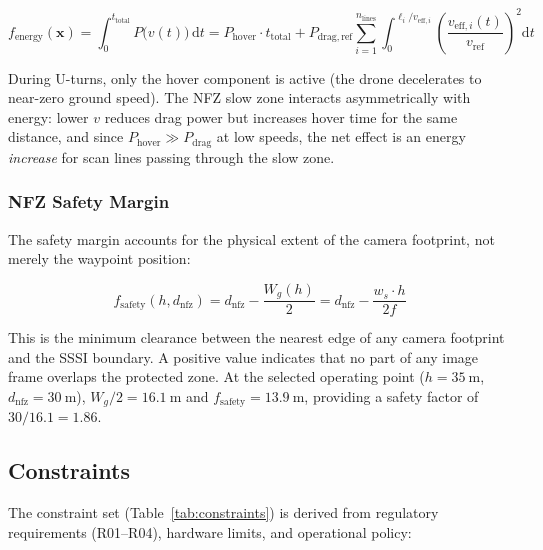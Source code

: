 \begin{equation}\label{eq:energy}
  f_{\mathrm{energy}}(\mathbf{x}) = \int_0^{t_{\mathrm{total}}} P\bigl(v(t)\bigr) \, \mathrm{d}t = P_{\mathrm{hover}} \cdot t_{\mathrm{total}} + P_{\mathrm{drag,ref}} \sum_{i=1}^{n_{\mathrm{lines}}} \int_0^{\ell_i / v_{\mathrm{eff},i}} \!\left(\frac{v_{\mathrm{eff},i}(t)}{v_{\mathrm{ref}}}\right)^{\!2} \mathrm{d}t
\end{equation}

\noindent During U-turns, only the hover component is active (the drone decelerates to near-zero ground speed). The NFZ slow zone interacts asymmetrically with energy: lower $v$ reduces drag power but increases hover time for the same distance, and since $P_{\mathrm{hover}} \gg P_{\mathrm{drag}}$ at low speeds, the net effect is an energy \emph{increase} for scan lines passing through the slow zone.

\subsubsection{NFZ Safety Margin}\label{sec:obj-safety}

The safety margin accounts for the physical extent of the camera footprint, not merely the waypoint position:

\begin{equation}\label{eq:safety}
  f_{\mathrm{safety}}(h, d_{\mathrm{nfz}}) = d_{\mathrm{nfz}} - \frac{W_g(h)}{2} = d_{\mathrm{nfz}} - \frac{w_s \cdot h}{2f}
\end{equation}

\noindent This is the minimum clearance between the nearest edge of any camera footprint and the SSSI boundary. A positive value indicates that no part of any image frame overlaps the protected zone. At the selected operating point ($h = \SI{35}{\metre}$, $d_{\mathrm{nfz}} = \SI{30}{\metre}$), $W_g/2 = \SI{16.1}{\metre}$ and $f_{\mathrm{safety}} = \SI{13.9}{\metre}$, providing a safety factor of $30/16.1 = 1.86$.

\subsection{Constraints}\label{sec:constraints}

The constraint set (Table~\ref{tab:constraints}) is derived from regulatory requirements (R01--R04), hardware limits, and operational policy:

